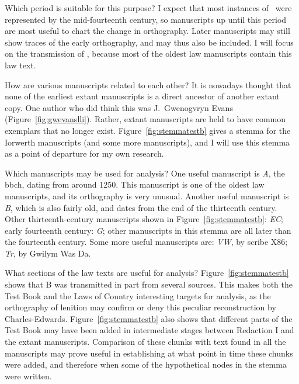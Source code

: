 Which period is suitable for this purpose?
I expect that most instances of \lT\ were represented by the mid-fourteenth century, so manuscripts up until this period are most useful to chart the change in orthography.
Later manuscripts may still show traces of the early orthography, and may thus also be included.
I will focus on the transmission of , because most of the oldest law manuscripts contain this law text.

How are various manuscripts related to each other?
It is nowadays thought that none of the earliest extant manuscripts is a direct ancestor of another extant copy.
One author who did think this was J.\ Gwenogvryn Evans (Figure~\ref{fig:gwevanslli}).
Rather, extant manuscripts are held to have common exemplars that no longer exist.
Figure~\ref{fig:stemmatestb} gives a stemma for the Iorwerth manuscripts (and some more manuscripts), and I will use this stemma as a point of departure for my own research.

Which manuscripts may be used for analysis?
One useful manuscript is \textit{A}, the \gls{bbch}, dating from around 1250. This manuscript is one of the oldest law manuscripts, and its orthography is very unusual.
Another useful manuscript is \textit{B}, which is also fairly old, and dates from the end of the thirteenth century.
Other thirteenth-century manuscripts shown in Figure~\ref{fig:stemmatestb}: \textit{EC};
early fourteenth century: \textit{G};
other manuscripts in this stemma are all later than the fourteenth century.
Some more useful manuscripts are: \textit{VW}, by scribe X86; \textit{Tr}, by Gwilym Was Da.

What sections of the law texts are useful for analysis?
Figure~\ref{fig:stemmatestb} shows that B was  transmitted in part from several sources. This makes both the Test Book and the Laws of Country interesting targets for analysis, as the orthography of lenition may confirm or deny this peculiar reconstruction by Charles-Edwards.
Figure~\ref{fig:stemmatestb} also shows that different parts of the Test Book may have been added in intermediate stages between Redaction I and the extant manuscripts.
Comparison of these chunks with text found in all the manuscripts may prove useful in establishing at what point in time these chunks were added, and therefore when some of the hypothetical nodes in the stemma were written.


